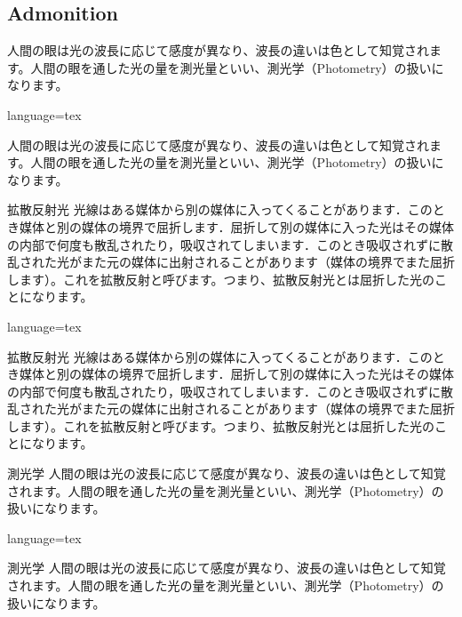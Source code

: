 \documentclass[../main]{subfiles}
\begin{document}
\subsection{Admonition}
\begin{Admonition}{}
    人間の眼は光の波長に応じて感度が異なり、波長の違いは色として知覚されます。人間の眼を通した光の量を測光量といい、測光学（Photometry）の扱いになります。
\end{Admonition}
\begin{Code}{language=tex}
\begin{Admonition}{}
    人間の眼は光の波長に応じて感度が異なり、波長の違いは色として知覚されます。人間の眼を通した光の量を測光量といい、測光学（Photometry）の扱いになります。
\end{Admonition}
\end{Code}

\HRuleLeader

\begin{Admonition}{拡散反射光}
    光線はある媒体から別の媒体に入ってくることがあります．このとき媒体と別の媒体の境界で屈折します．屈折して別の媒体に入った光はその媒体の内部で何度も散乱されたり，吸収されてしまいます．このとき吸収されずに散乱された光がまた元の媒体に出射されることがあります（媒体の境界でまた屈折します）。これを拡散反射と呼びます。つまり、拡散反射光とは屈折した光のことになります。
\end{Admonition}
\begin{Code}{language=tex}
\begin{Admonition}{拡散反射光}
    光線はある媒体から別の媒体に入ってくることがあります．このとき媒体と別の媒体の境界で屈折します．屈折して別の媒体に入った光はその媒体の内部で何度も散乱されたり，吸収されてしまいます．このとき吸収されずに散乱された光がまた元の媒体に出射されることがあります（媒体の境界でまた屈折します）。これを拡散反射と呼びます。つまり、拡散反射光とは屈折した光のことになります。
\end{Admonition}
\end{Code}

\begin{Admonition}[type=info]{測光学}
    人間の眼は光の波長に応じて感度が異なり、波長の違いは色として知覚されます。人間の眼を通した光の量を測光量といい、測光学（Photometry）の扱いになります。
\end{Admonition}
\begin{Code}{language=tex}
\begin{Admonition}[type=info]{測光学}
    人間の眼は光の波長に応じて感度が異なり、波長の違いは色として知覚されます。人間の眼を通した光の量を測光量といい、測光学（Photometry）の扱いになります。
\end{Admonition}
\end{Code}
\end{document}
